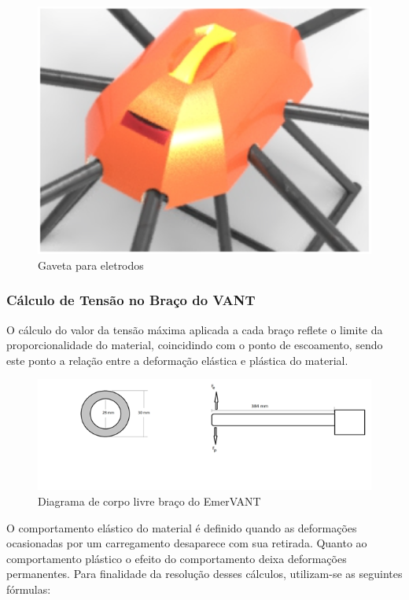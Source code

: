 \begin{figure}[H]
    \centering
      \includegraphics[keepaspectratio=true,scale=0.5]{figuras/keyshot2.eps}
    \caption{ Gaveta para eletrodos}
    \label{fig:keyshot2}
\end{figure}

\subsubsection{Cálculo de Tensão no Braço do VANT}

O cálculo do valor da tensão máxima aplicada a cada braço reflete o limite da proporcionalidade
do material, coincidindo com o ponto de escoamento, sendo este ponto a relação entre a 
deformação elástica e plástica do material. 

\begin{figure}[H]
    \centering
      \includegraphics[keepaspectratio=true,scale=0.5]{figuras/corpo_livre.png}
    \caption{Diagrama de corpo livre braço do EmerVANT}
    \label{fig:diagrama_corpo}
\end{figure}

O comportamento elástico do material é definido quando as deformações ocasionadas por um 
carregamento desaparece com sua retirada. Quanto ao comportamento plástico o efeito do 
comportamento deixa deformações permanentes. Para finalidade da resolução desses cálculos, 
utilizam-se as seguintes fórmulas:

